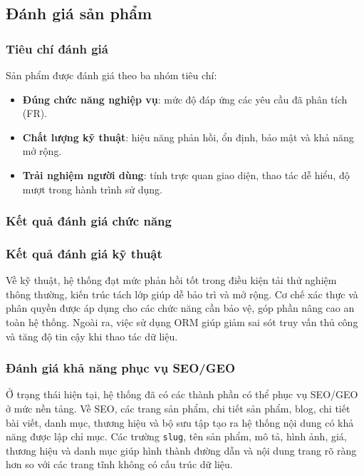 \documentclass[13pt]{article}
\begin{document}
\subsection{Đánh giá sản phẩm}

\subsubsection{Tiêu chí đánh giá}
Sản phẩm được đánh giá theo ba nhóm tiêu chí:
\begin{itemize}
    \item \textbf{Đúng chức năng nghiệp vụ}: mức độ đáp ứng các yêu cầu đã phân tích (FR).
    \item \textbf{Chất lượng kỹ thuật}: hiệu năng phản hồi, ổn định, bảo mật và khả năng mở rộng.
    \item \textbf{Trải nghiệm người dùng}: tính trực quan giao diện, thao tác dễ hiểu, độ mượt trong hành trình sử dụng.
\end{itemize}

\subsubsection{Kết quả đánh giá chức năng}

\subsubsection{Kết quả đánh giá kỹ thuật}
Về kỹ thuật, hệ thống đạt mức phản hồi tốt trong điều kiện tải thử nghiệm thông thường, kiến trúc tách lớp giúp dễ bảo trì và mở rộng. 
Cơ chế xác thực và phân quyền được áp dụng cho các chức năng cần bảo vệ, góp phần nâng cao an toàn hệ thống. 
Ngoài ra, việc sử dụng ORM giúp giảm sai sót truy vấn thủ công và tăng độ tin cậy khi thao tác dữ liệu.

\subsubsection{Đánh giá khả năng phục vụ SEO/GEO}
Ở trạng thái hiện tại, hệ thống đã có các thành phần có thể phục vụ SEO/GEO ở mức nền tảng. Về SEO, các trang sản phẩm, chi tiết sản phẩm, blog, chi tiết bài viết, danh mục, thương hiệu và bộ sưu tập tạo ra hệ thống nội dung có khả năng được lập chỉ mục. Các trường \texttt{slug}, tên sản phẩm, mô tả, hình ảnh, giá, thương hiệu và danh mục giúp hình thành đường dẫn và nội dung trang rõ ràng hơn so với các trang tĩnh không có cấu trúc dữ liệu.
\end{document}
